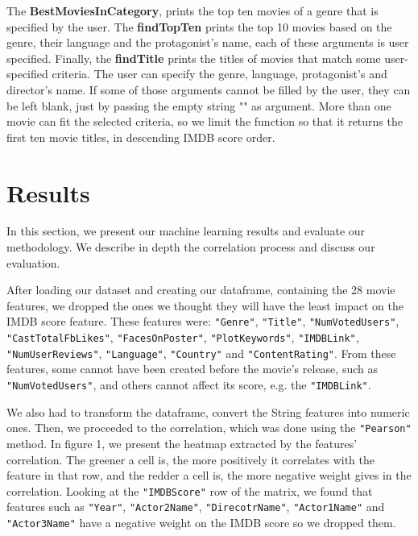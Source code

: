 \documentclass[letterpaper,twocolumn,10pt]{article}
\begin{document}
The \textbf{BestMoviesInCategory}, prints the top ten movies of a genre that is specified by the user. The \textbf{findTopTen} prints the top 10 movies based on the genre, their language and the protagonist's name, each of these arguments is user specified. Finally, the \textbf{findTitle} prints the titles of movies that match some user-specified criteria. The user can specify the genre, language, protagonist's and director's name. If some of those arguments cannot be filled by the user, they can be left blank, just by passing the empty string "" as argument. More than one movie can fit the selected criteria, so we limit the function so that it returns the first ten movie titles, in descending IMDB score order. \par

\section{Results}
In this section, we present our machine learning results and evaluate our methodology. We describe in depth the correlation process and discuss our evaluation.\par
After loading our dataset and creating our dataframe, containing the 28 movie features, we dropped the ones we thought they will have the least impact on the IMDB score feature. These features were: \texttt{"Genre"}, \texttt{"Title"}, \texttt{"NumVotedUsers"}, \texttt{"CastTotalFbLikes"}, \texttt{"FacesOnPoster"}, \texttt{"PlotKeywords"}, \texttt{"IMDBLink"}, \texttt{"NumUserReviews"}, \texttt{"Language"}, \texttt{"Country"} and \texttt{"ContentRating"}. From these features, some cannot have been created before the movie's release, such as \texttt{"NumVotedUsers"}, and others cannot affect its score, e.g. the \texttt{"IMDBLink"}.\par 

We also had to transform the dataframe, convert the String features into numeric ones. Then, we proceeded to the correlation, which was done using the \texttt{"Pearson"} method. In figure 1, we present the heatmap extracted by the features' correlation. The greener a cell is, the more positively it correlates with the feature in that row, and the redder a cell is, the more negative weight gives in the correlation. Looking at the \texttt{"IMDBScore"} row of the matrix, we found that features such as \texttt{"Year"}, \texttt{"Actor2Name"}, \texttt{"DirecotrName"}, \texttt{"Actor1Name"} and \texttt{"Actor3Name"} have a negative weight on the IMDB score so we dropped them.
\end{document}
